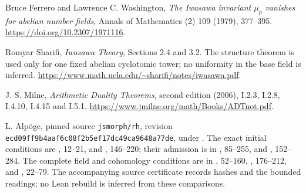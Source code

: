 Bruce Ferrero and Lawrence C. Washington,
\emph{The Iwasawa invariant $\mu_p$ vanishes for abelian number fields},
Annals of Mathematics (2) 109 (1979), 377--395.
\url{https://doi.org/10.2307/1971116}.

Romyar Sharifi, \emph{Iwasawa Theory}, Sections 2.4 and 3.2.
The structure theorem is used only for one fixed abelian
cyclotomic tower; no uniformity in the base field is inferred.
\url{https://www.math.ucla.edu/~sharifi/notes/iwasawa.pdf}.

J. S. Milne, \emph{Arithmetic Duality Theorems}, second edition (2006),
I.2.3, I.2.8, I.4.10, I.4.15 and I.5.1.
\url{https://www.jmilne.org/math/Books/ADTnot.pdf}.

L. Alp\"oge, pinned source \texttt{jsmorph/rh}, revision
\texttt{ecd09ff9b4aaf6c08f2b5ef17dc49ca9648a77de}, under
.
The exact initial conditions are
, 12--21,
and , 146--220;
their admission is in
, 85--255,
and , 152--284.
The complete field and cohomology conditions are in
, 52--160,
, 176--212,
and , 22--79.
The accompanying source certificate records hashes and the bounded
readings; no Lean rebuild is inferred from these comparisons.
